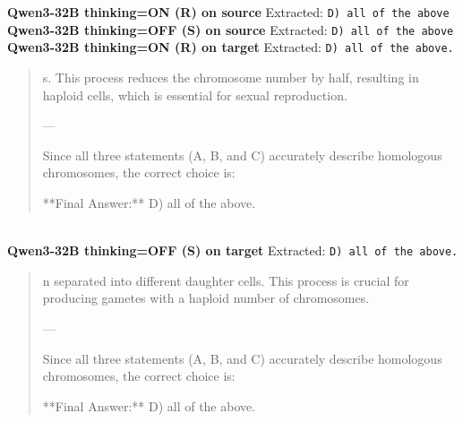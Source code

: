 \begin{tcolorbox}[
  colback=gray!5, colframe=gray!40,
  title={\textbf{Example 5: Pure Knowledge Bottleneck}},
  fonttitle=\small\bfseries, breakable]
\vspace{4pt}
\textbf{Qwen3-32B thinking=ON (R) on source} \textcolor{darkgreen}{\cmark} Extracted: \texttt{D) all of the above}
\\[-2pt]
\textbf{Qwen3-32B thinking=OFF (S) on source} \textcolor{darkgreen}{\cmark} Extracted: \texttt{D) all of the above}
\\[-2pt]
\textbf{Qwen3-32B thinking=ON (R) on target} \textcolor{red}{\xmark} Extracted: \texttt{D) all of the above.}
\begin{quote}\scriptsize\ttfamily [...] s. This process reduces the chromosome number by half, resulting in haploid cells, which is essential for sexual reproduction.

---

Since all three statements (A, B, and C) accurately describe homologous chromosomes, the correct choice is:

**Final Answer:** D) all of the above.\end{quote}
\\[-2pt]
\textbf{Qwen3-32B thinking=OFF (S) on target} \textcolor{red}{\xmark} Extracted: \texttt{D) all of the above.}
\begin{quote}\scriptsize\ttfamily [...] n separated into different daughter cells. This process is crucial for producing gametes with a haploid number of chromosomes.

---

Since all three statements (A, B, and C) accurately describe homologous chromosomes, the correct choice is:

**Final Answer:** D) all of the above.\end{quote}
\\[-2pt]
\end{tcolorbox}
\vspace{8pt}
